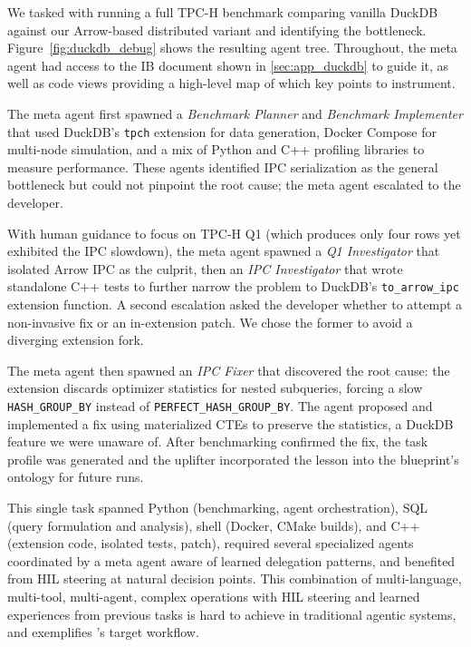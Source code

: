 We tasked \sysname with running a full TPC-H benchmark comparing vanilla DuckDB against our Arrow-based distributed variant and identifying the bottleneck. Figure~\ref{fig:duckdb_debug} shows the resulting agent tree. Throughout, the meta agent had access to the IB document shown in \cref{sec:app_duckdb} to guide it, as well as code views providing a high-level map of which key points to instrument.

The meta agent first spawned a \textit{Benchmark Planner} and \textit{Benchmark Implementer} that used DuckDB's \texttt{tpch} extension for data generation, Docker Compose for multi-node simulation, and a mix of Python and C++ profiling libraries to measure performance. These agents identified IPC serialization as the general bottleneck but could not pinpoint the root cause; the meta agent escalated to the developer.

With human guidance to focus on TPC-H Q1 (which produces only four rows yet exhibited the IPC slowdown), the meta agent spawned a \textit{Q1 Investigator} that isolated Arrow IPC as the culprit, then an \textit{IPC Investigator} that wrote standalone C++ tests to further narrow the problem to DuckDB's \texttt{to\_arrow\_ipc} extension function. A second escalation asked the developer whether to attempt a non-invasive fix or an in-extension patch. We chose the former to avoid a diverging extension fork.

The meta agent then spawned an \textit{IPC Fixer} that discovered the root cause: the extension discards optimizer statistics for nested subqueries, forcing a slow \texttt{HASH\_GROUP\_BY} instead of \texttt{PERFECT\_\-HASH\_\-GROUP\_BY}. The agent proposed and implemented a fix using materialized CTEs to preserve the statistics, a DuckDB feature we were unaware of. After benchmarking confirmed the fix, the task profile was generated and the uplifter incorporated the lesson into the blueprint's ontology for future runs.

This single task spanned Python (benchmarking, agent orchestration), SQL (query formulation and analysis), shell (Docker, CMake builds), and C++ (extension code, isolated tests, patch), required several specialized agents coordinated by a meta agent aware of learned delegation patterns, and benefited from HIL steering at natural decision points. This combination of multi-language, multi-tool, multi-agent, complex operations with HIL steering and learned experiences from previous tasks is hard to achieve in traditional agentic systems, and exemplifies \sysname's target workflow.

